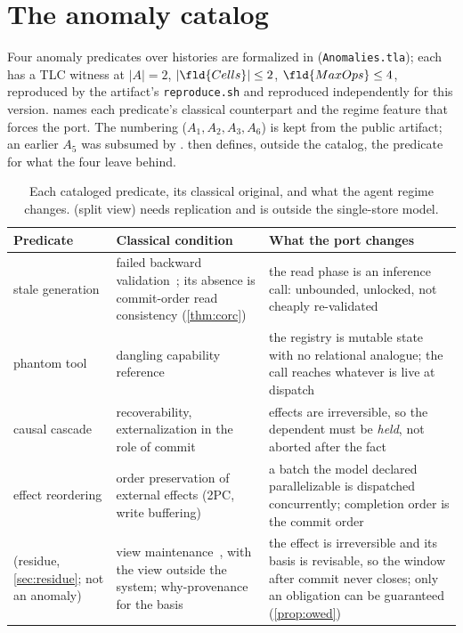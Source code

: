 \section{The anomaly catalog}
\label{sec:anomalies}

Four anomaly predicates over histories are formalized in \TLA{}
(\texttt{Anomalies.tla}); each has a TLC witness at $|A|{=}2$,
$|\fld{Cells}|\le 2$, $\fld{MaxOps}\le 4$, reproduced by the artifact's
\texttt{reproduce.sh} and reproduced independently for this version.
 names each predicate's classical counterpart and the
regime feature that forces the port. The numbering ($A_1, A_2, A_3, A_6$) is
kept from the public artifact; an earlier $A_5$ was subsumed by .
 then defines, outside the catalog, the predicate for what
the four leave behind.

\begin{table}[t]
\centering
\caption{Each cataloged predicate, its classical original, and what the agent
regime changes.  (split view) needs replication and is outside the
single-store model.}
\label{tab:classical}
\footnotesize
\setlength{\tabcolsep}{3pt}
\begin{tabular}{@{}p{1.55cm}p{2.75cm}p{3.85cm}@{}}
\toprule
Predicate & Classical condition & What the port changes \\
\midrule
\A1 stale generation & failed backward validation~\cite{KungRobinson1981OCC}; its absence is commit-order read consistency (\cref{thm:corc}) & the read phase is an inference call: unbounded, unlocked, not cheaply re-validated \\
\A2 phantom tool & dangling capability reference~\cite{Miller2006Robust} & the registry is mutable state with no relational analogue; the call reaches whatever is live at dispatch \\
\A3 causal cascade & recoverability, externalization in the role of commit~\cite{BernsteinHadzilacosGoodman1987} & effects are irreversible, so the dependent must be \emph{held}, not aborted after the fact \\
\A6 effect reordering & order preservation of external effects (2PC, write buffering) & a batch the model declared parallelizable is dispatched concurrently; completion order is the commit order \\
\Rp{} (residue, \cref{sec:residue}; not an anomaly) & view maintenance~\cite{GuptaMumick1995ViewMaint}, with the view outside the system; why-provenance~\cite{BunemanEtAl2001Why} for the basis & the effect is irreversible and its basis is revisable, so the window after commit never closes; only an obligation can be guaranteed (\cref{prop:owed}) \\
\bottomrule
\end{tabular}
\end{table}

